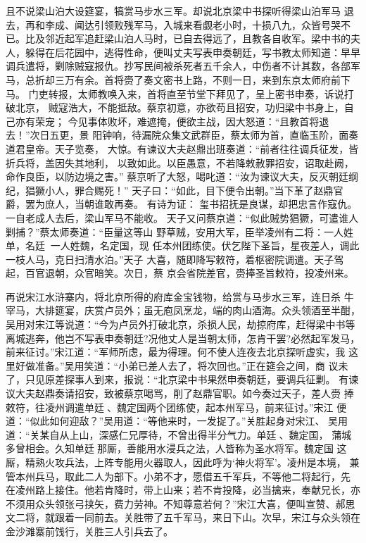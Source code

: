 且不说梁山泊大设筵宴，犒赏马步水三军。却说北京梁中书探听得梁山泊军马
退去，再和李成、闻达引领败残军马，入城来看觑老小时，十损八九，众皆号哭不
已。比及邻近起军追赶梁山泊人马时，已自去得远了，且教各自收军。梁中书的夫
人，躲得在后花园中，逃得性命，便叫丈夫写表申奏朝廷，写书教太师知道：早早
调兵遣将，剿除贼寇报仇。抄写民间被杀死者五千余人，中伤者不计其数，各部军
马，总折却三万有余。首将赍了奏文密书上路，不则一日，来到东京太师府前下马。
门吏转报，太师教唤入来，首将直至节堂下拜见了，呈上密书申奏，诉说打破北京，
贼寇浩大，不能抵敌。蔡京初意，亦欲苟且招安，功归梁中书身上，自己亦有荣宠；
今见事体败坏，难遮掩，便欲主战，因大怒道：“且教首将退去！”次日五更，景
阳钟响，待漏院众集文武群臣，蔡太师为首，直临玉阶，面奏道君皇帝。天子览奏，
大惊。有谏议大夫赵鼎出班奏道：“前者往往调兵征发，皆折兵将，盖因失其地利，
以致如此。以臣愚意，不若降敕赦罪招安，诏取赴阙，命作良臣，以防边境之害。”
蔡京听了大怒，喝叱道：“汝为谏议大夫，反灭朝廷纲纪，猖獗小人，罪合赐死！”
天子曰：“如此，目下便令出朝。”当下革了赵鼎官爵，罢为庶人，当朝谁敢再奏。
有诗为证：
玺书招抚是良谋，却把忠言作寇仇。
一自老成人去后，梁山军马不能收。
天子又问蔡京道：“似此贼势猖獗，可遣谁人剿捕？”蔡太师奏道：“臣量这等山
野草贼，安用大军，臣举凌州有二将：一人姓单，名廷；一人姓魏，名定国，现
任本州团练使。伏乞陛下圣旨，星夜差人，调此一枝人马，克日扫清水泊。”天子
大喜，随即降写敕符，着枢密院调遣。天子驾起，百官退朝，众官暗笑。次日，蔡
京会省院差官，赍捧圣旨敕符，投凌州来。

再说宋江水浒寨内，将北京所得的府库金宝钱物，给赏与马步水三军，连日杀
牛宰马，大排筵宴，庆赏卢员外；虽无庖凤烹龙，端的肉山酒海。众头领酒至半酣，
吴用对宋江等说道：“今为卢员外打破北京，杀损人民，劫掠府库，赶得梁中书等
离城逃奔，他岂不写表申奏朝廷?况他丈人是当朝太师，怎肯干罢?必然起军发马，
前来征讨。”宋江道：“军师所虑，最为得理。何不使人连夜去北京探听虚实，我
这里好做准备。”吴用笑道：“小弟已差人去了，将次回也。”正在筵会之间，商
议未了，只见原差探事人到来，报说：“北京梁中书果然申奏朝廷，要调兵征剿。
有谏议大夫赵鼎奏请招安，致被蔡京喝骂，削了赵鼎官职。如今奏过天子，差人赍
捧敕符，往凌州调遣单廷、魏定国两个团练使，起本州军马，前来征讨。”宋江
便道：“似此如何迎敌？”吴用道：“等他来时，一发捉了。”关胜起身对宋江、
吴用道：“关某自从上山，深感仁兄厚待，不曾出得半分气力。单廷、魏定国，
蒲城多曾相会。久知单廷那厮，善能用水浸兵之法，人皆称为圣水将军。魏定国
这厮，精熟火攻兵法，上阵专能用火器取人，因此呼为‘神火将军’。凌州是本境，
兼管本州兵马，取此二人为部下。小弟不才，愿借五千军兵，不等他二将起行，先
在凌州路上接住。他若肯降时，带上山来；若不肯投降，必当擒来，奉献兄长，亦
不须用众头领张弓挟矢，费力劳神。不知尊意若何？”宋江大喜，便叫宣赞、郝思
文二将，就跟着一同前去。关胜带了五千军马，来日下山。次早，宋江与众头领在
金沙滩寨前饯行，关胜三人引兵去了。

